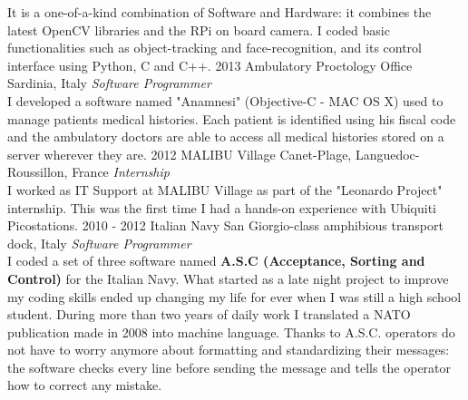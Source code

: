 \documentclass[]{friggeri-cv} %
\begin{document}
\begin{entrylist}
{It is a one-of-a-kind combination of Software and Hardware: it combines the latest OpenCV libraries and the RPi on board camera. I coded basic functionalities such as object-tracking and face-recognition, and its control interface using Python, C and C++.}
\entry
{2013}
{Ambulatory Proctology Office}
{Sardinia, Italy}
{\emph{Software Programmer} \\
I developed a software named "Anamnesi" (Objective-C - MAC OS X) used to manage patients medical histories. Each patient is identified using his fiscal code and the ambulatory doctors are able to access all medical histories stored on a server wherever they are.}
\entry
{2012}
{MALIBU Village}
{Canet-Plage, Languedoc-Roussillon, France}
{\emph{Internship} \\
I worked as IT Support at MALIBU Village as part of the "Leonardo Project" internship. This was the first time I had a hands-on experience with Ubiquiti Picostations.}
\entry
{2010 - 2012}
{Italian Navy}
{San Giorgio-class amphibious transport dock, Italy}
{\emph{Software Programmer} \\
I coded a set of three software named \textbf{A.S.C (Acceptance, Sorting and Control)} for the Italian Navy. What started as a late night project to improve my coding skills ended up changing my life for ever when I was still a high school student. During more than two years of daily work I translated a NATO publication made in 2008 into machine language. Thanks to A.S.C. operators do not have to worry anymore about formatting and standardizing their messages: the software checks every line before sending the message and tells the operator how to correct any mistake.}
\end{entrylist}

\newpage

\end{document}
